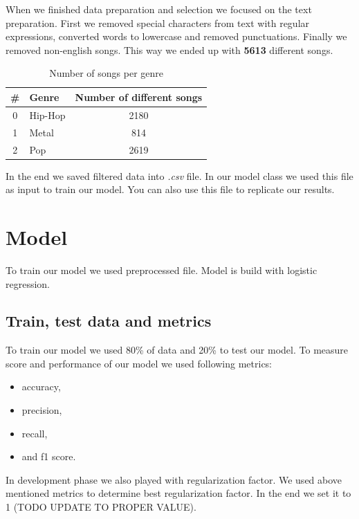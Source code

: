 \documentclass[a4paper,11pt]{article}
\begin{document}
When we finished data preparation and selection we focused on the text preparation. First we removed special characters from text with regular expressions, converted words to lowercase and removed punctuations. Finally we removed non-english songs. This way we ended up with \textbf{5613} different songs.

\begin{table}[h!]
\centering
\label{baseline}
\begin{tabular}{clc}
\hline
\# & Genre & Number of different songs \\
\hline
0 & Hip-Hop & 2180 \\
1 & Metal & 814 \\
2 & Pop & 2619 \\
\end{tabular}
\caption{Number of songs per genre}
\end{table}

In the end we saved filtered data into \textit{.csv} file. In our model class we used this file as input to train our model. You can also use this file to replicate our results.

\section{Model}

To train our model we used preprocessed file. Model is build with logistic regression.

\subsection{Train, test data and metrics}
To train our model we used 80\% of data and 20\% to test our model. To measure score and performance of our model we used following metrics:
\begin{itemize}
\item accuracy,
\item precision,
\item recall,
\item and f1 score.
\end{itemize}

In development phase we also played with regularization factor. We used above mentioned metrics to determine best regularization factor. In the end we set it to 1 (TODO UPDATE TO PROPER VALUE).
\end{document}

